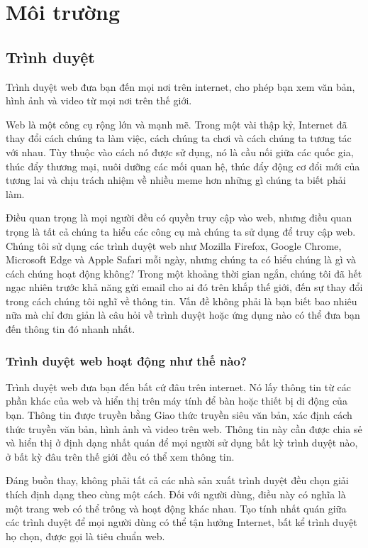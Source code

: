 \documentclass[11pt]{report}
\begin{document}
	\section{Môi trường}
	
	\subsection{Trình duyệt \cite{web:browser:what}} \label{subsection:webclient}
	Trình duyệt web đưa bạn đến mọi nơi trên internet, cho phép bạn xem văn bản, hình ảnh và video từ mọi nơi trên thế giới.
	
	Web là một công cụ rộng lớn và mạnh mẽ. Trong một vài thập kỷ, Internet đã thay đổi cách chúng ta làm việc, cách chúng ta chơi và cách chúng ta tương tác với nhau. Tùy thuộc vào cách nó được sử dụng, nó là cầu nối giữa các quốc gia, thúc đẩy thương mại, nuôi dưỡng các mối quan hệ, thúc đẩy động cơ đổi mới của tương lai và chịu trách nhiệm về nhiều meme hơn những gì chúng ta biết phải làm.
	
	Điều quan trọng là mọi người đều có quyền truy cập vào web, nhưng điều quan trọng là tất cả chúng ta hiểu các công cụ mà chúng ta sử dụng để truy cập web. Chúng tôi sử dụng các trình duyệt web như Mozilla Firefox, Google Chrome, Microsoft Edge và Apple Safari mỗi ngày, nhưng chúng ta có hiểu chúng là gì và cách chúng hoạt động không? Trong một khoảng thời gian ngắn, chúng tôi đã hết ngạc nhiên trước khả năng gửi email cho ai đó trên khắp thế giới, đến sự thay đổi trong cách chúng tôi nghĩ về thông tin. Vấn đề không phải là bạn biết bao nhiêu nữa mà chỉ đơn giản là câu hỏi về trình duyệt hoặc ứng dụng nào có thể đưa bạn đến thông tin đó nhanh nhất.
	
	
	\subsubsection{Trình duyệt web hoạt động như thế nào?}
	Trình duyệt web đưa bạn đến bất cứ đâu trên internet. Nó lấy thông tin từ các phần khác của web và hiển thị trên máy tính để bàn hoặc thiết bị di động của bạn. Thông tin được truyền bằng Giao thức truyền siêu văn bản, xác định cách thức truyền văn bản, hình ảnh và video trên web. Thông tin này cần được chia sẻ và hiển thị ở định dạng nhất quán để mọi người sử dụng bất kỳ trình duyệt nào, ở bất kỳ đâu trên thế giới đều có thể xem thông tin.
	
	Đáng buồn thay, không phải tất cả các nhà sản xuất trình duyệt đều chọn giải thích định dạng theo cùng một cách. Đối với người dùng, điều này có nghĩa là một trang web có thể trông và hoạt động khác nhau. Tạo tính nhất quán giữa các trình duyệt để mọi người dùng có thể tận hưởng Internet, bất kể trình duyệt họ chọn, được gọi là tiêu chuẩn web.
	
\end{document}
